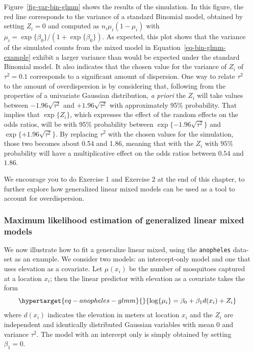 \documentclass[
  letterpaper,
]{krantz}
\begin{document}
Figure~\ref{fig-var-bin-glmm} shows the results of the simulation. In
this figure, the red line corresponds to the variance of a standard
Binomial model, obtained by setting \(Z_i=0\) and computed as
\(n_i \mu_i (1-\mu_i)\) with
\(\mu_i = \exp\{\beta_0\}/(1+\exp\{\beta_0\})\). As expected, this plot
shows that the variance of the simulated counts from the mixed model in
Equation~\ref{eq-bin-glmm-example} exhibit a larger variance than would
be expected under the standard Binomial model. It also indicates that
the chosen value for the variance of \(Z_i\) of \(\tau^2 = 0.1\)
corresponds to a significant amount of dispersion. One way to relate
\(\tau^2\) to the amount of overdispersion is by considering that,
following from the properties of a univariate Gaussian distribution,
\emph{a priori} the \(Z_i\) will take values between
\(-1.96 \sqrt{\tau^2}\) and \(+1.96 \sqrt{\tau^2}\) with approximately
95\(\%\) probability. That implies that \(\exp\{Z_i\}\), which expresses
the effect of the random effects on the odds ratios, will be with
95\(\%\) probability between \(\exp\{-1.96 \sqrt{\tau^2}\}\) and
\(\exp\{+1.96 \sqrt{\tau^2}\}\). By replacing \(\tau^2\) with the chosen
values for the simulation, those two becomes about 0.54 and 1.86,
meaning that with the \(Z_i\) with \(95\%\) probability will have a
multiplicative effect on the odds ratios between \(0.54\) and \(1.86\).

We encourage you to do Exercise 1 and Exercise 2 at the end of this
chapter, to further explore how generalized linear mixed models can be
used as a tool to account for overdispersion.

\hypertarget{maximum-likelihood-estimation-of-generalized-linear-mixed-models}{%
\subsubsection{Maximum likelihood estimation of generalized linear mixed
models}\label{maximum-likelihood-estimation-of-generalized-linear-mixed-models}}

We now illustrate how to fit a generalize linear mixed, using the
\texttt{anopheles} data-set as an example. We consider two models: an
intercept-only model and one that uses elevation as a covariate. Let
\(\mu(x_i)\) be the number of mosquitoes captured at a location \(x_i\);
then the linear predictor with elevation as a covariate takes the form
\begin{equation}\protect\hypertarget{eq-anopheles-glmm}{}{
\log\{\mu_i\} = \beta_{0} + \beta_{1} d(x_i) + Z_i
}\label{eq-anopheles-glmm}\end{equation} where \(d(x_i)\) indicates the
elevation in meters at location \(x_i\) and the \(Z_i\) are independent
and identically distributed Gaussian variables with mean 0 and variance
\(\tau^2\). The model with an intercept only is simply obtained by
setting \(\beta_1 = 0\).
\end{document}
